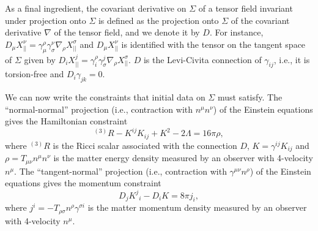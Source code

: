 \documentclass[a4paper,11pt]{article}
\numberwithin{equation}{section}
\begin{document}
As a final ingredient, the covariant derivative on $\Sigma$ of a tensor field invariant under projection onto $\Sigma$ is defined as the projection onto $\Sigma$ of the covariant derivative $\nabla$ of the tensor field, and we denote it by $D$. For instance, $D_\mu X_{||}^\nu=\gamma^\rho_\mu \gamma^\nu_\sigma \nabla_\rho X_{||}^\sigma$ and $D_\mu X_{||}^\nu$ is identified with the tensor on the tangent space of $\Sigma$ given by $D_i X_{||}^j=\gamma^\rho_i \gamma^j_\sigma \nabla_\rho X_{||}^\sigma$. $D$ is the Levi-Civita connection of $\gamma_{ij}$, i.e., it is torsion-free and $D_i\gamma_{jk}=0$.

We can now write the constraints that initial data on $\Sigma$ must satisfy. The ``normal-normal'' projection (i.e., contraction with $n^\mu n^\nu$) of the Einstein equations gives the Hamiltonian constraint
\begin{equation}
\label{eq:hamconstr}
^{(3)}R-K^{ij}K_{ij}+K^2-2\Lambda=16\pi\rho,
\end{equation}
where $^{(3)}R$ is the Ricci scalar associated with the connection $D$, $K=\gamma^{ij}K_{ij}$ and $\rho=T_{\mu\nu}n^\mu n^\nu$ is the matter energy density measured by an observer with 4-velocity $n^\mu$.
The ``tangent-normal'' projection (i.e., contraction with $\gamma^{\mu\nu} n^\rho$) of the Einstein equations gives the momentum constraint
\begin{equation}
\label{eq:momconstr}
D_j {K^j}_i-D_i K=8\pi j_i,
\end{equation}
where $j^i=-T_{\rho\sigma}n^\rho\gamma^{\sigma i}$ is the matter momentum density measured by an observer with 4-velocity $n^\mu$. %
\end{document}
